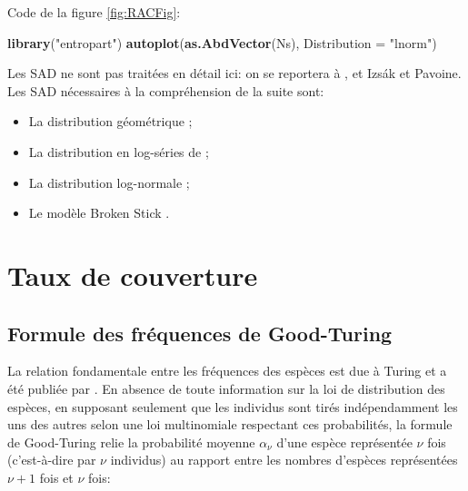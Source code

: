 \documentclass[
  11pt,
  french,
  a4paper,
  extrafontsizes,onecolumn,openright
  ]{memoir}
\newenvironment{Shaded}{\begin{snugshade}}{\end{snugshade}}
\newcommand{\DataTypeTok}[1]{\textcolor[rgb]{0.13,0.29,0.53}{#1}}
\newcommand{\KeywordTok}[1]{\textcolor[rgb]{0.13,0.29,0.53}{\textbf{#1}}}
\newcommand{\NormalTok}[1]{#1}
\newcommand{\StringTok}[1]{\textcolor[rgb]{0.31,0.60,0.02}{#1}}
\providecommand{\tightlist}{%
  \setlength{\itemsep}{0pt}\setlength{\parskip}{0pt}}
\begin{document}
\normalsize

Code de la figure \ref{fig:RACFig}:

\scriptsize

\begin{Shaded}
\begin{Highlighting}[]
\KeywordTok{library}\NormalTok{(}\StringTok{"entropart"}\NormalTok{)}
\KeywordTok{autoplot}\NormalTok{(}\KeywordTok{as.AbdVector}\NormalTok{(Ns), }\DataTypeTok{Distribution =} \StringTok{"lnorm"}\NormalTok{)}
\end{Highlighting}
\end{Shaded}

\normalsize

Les SAD ne sont pas traitées en détail ici: on se reportera à \textcite{Magurran1988}, \textcite{McGill2007} et Izsák et Pavoine.
Les SAD nécessaires à la compréhension de la suite sont:

\begin{itemize}
\tightlist
\item
  La distribution géométrique \autocite{Motomura1932,Whittaker1972};
\item
  La distribution en log-séries de \textcite{Fisher1943};
\item
  La distribution log-normale \autocite{Preston1948};
\item
  Le modèle Broken Stick \autocite{MacArthur1957}.
\end{itemize}

\hypertarget{sec:Couverture}{%
\section{Taux de couverture}\label{sec:Couverture}}

\hypertarget{formule-des-fruxe9quences-de-good-turing}{%
\subsection{Formule des fréquences de Good-Turing}\label{formule-des-fruxe9quences-de-good-turing}}

La relation fondamentale entre les fréquences des espèces est due à Turing et a été publiée par \textcite{Good1953}.
En absence de toute information sur la loi de distribution des espèces, en supposant seulement que les individus sont tirés indépendamment les uns des autres selon une loi multinomiale respectant ces probabilités, la formule de Good-Turing relie la probabilité moyenne \(\alpha_\nu\) d'une espèce représentée \(\nu\) fois (c'est-à-dire par \(\nu\) individus) au rapport entre les nombres d'espèces représentées \(\nu+1\) fois et \(\nu\) fois:
\end{document}
